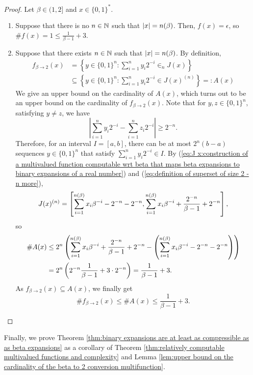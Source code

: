 \begin{proof}
    Let $\beta \in (1,2]$ and $x \in \{0,1\}^\ast$. 
    \begin{enumerate}[label=(\alph*)]
        \item Suppose that there is no $n \in \mathbb{N}$ such that $\left| x \right| = n(\beta)$. Then, $f(x) = \epsilon$, so $\#f(x) = 1 \leq \frac{1}{\beta-1} + 3$.
        \item Suppose that there exists $n \in \mathbb{N}$ such that $\left| x \right| = n(\beta)$. By definition,
        \begin{align}
            f_{\beta \to 2}(x) &= \left\{ y \in \{0,1\}^n :  \sum_{i=1}^{n} y_i 2^{-i} \in_n J(x)\right\}\\
            &\subseteq \left\{ y \in \{0,1\}^n :  \sum_{i=1}^{n} y_i 2^{-i} \in J(x)^{(n)}\right\} =: A(x)
        \end{align}
        We give an upper bound on the cardinality of $A(x)$, which turns out to be an upper bound on the cardinality of $f_{\beta \to 2}(x)$. Note that for $y,z \in \{0,1\}^n$, satisfying $y \neq z$, we have
        \begin{equation}
            \left|\sum_{i=1}^{n} y_i 2^{-i} - \sum_{i=1}^{n} z_i 2^{-i}\right| \geq 2^{-n}.
        \end{equation}
        Therefore, for an interval $I = [a,b]$, there can be at most $2^n(b-a)$ sequences $y \in \{0,1\}^n$ that satisfy $\sum_{i=1}^{n} y_i 2^{-i} \in I$. 
        By (\ref{eq:J x:construction of a multivalued function computable wrt beta that maps beta expansions to binary expansions of a real number}) and (\ref{eq:definition of superset of size 2 -n more}),
        \begin{equation}
            J(x)^{(n)} = \left[\sum_{i=1}^{n(\beta)} x_i \beta^{-i} - 2^{-n} - 2^{-n}, \sum_{i=1}^{n(\beta)} x_i \beta^{-i}+ \frac{2^{-n}}{\beta-1} + 2^{-n}\right],
        \end{equation}
        so
        \begin{align}
            \#A(x) &\leq 2^n \left(\sum_{i=1}^{n(\beta)} x_i \beta^{-i}+ \frac{2^{-n}}{\beta-1} + 2^{-n} - \left(\sum_{i=1}^{n(\beta)} x_i \beta^{-i} - 2^{-n} - 2^{-n} \right)\right)\\
            &= 2^n \left(2^{-n}\frac{1}{\beta-1} + 3\cdot2^{-n}\right) = \frac{1}{\beta-1} + 3.
        \end{align}
        As $f_{\beta \to 2}(x) \subseteq A(x)$, we finally get
        \begin{equation}
            \#f_{\beta \to 2}(x) \leq \#A(x) \leq \frac{1}{\beta-1} + 3.
        \end{equation}
    \end{enumerate}
\end{proof}
\noindent Finally, we prove Theorem \ref{thm:binary expansions are at least as compressible as as beta expansions} as a corollary of Theorem \ref{thm:relatively computable multivalued functions and complexity} and Lemma \ref{lem:upper bound on the cardinality of the beta to 2 conversion multifunction}. 

